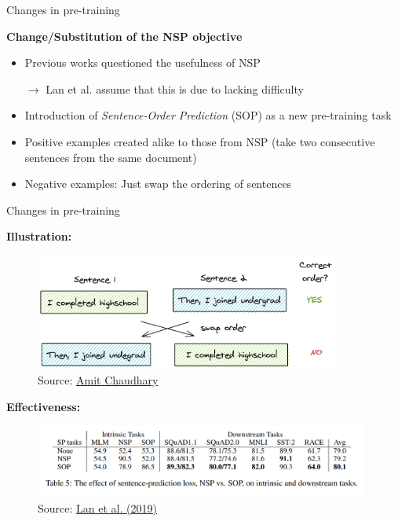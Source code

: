 
\begin{frame}{Changes in pre-training}

\vfill

	\textbf{Change/Substitution of the NSP objective}
		
	\begin{itemize}
			\item Previous works questioned the usefulness of NSP
			\item[$\to$] Lan et al. assume that this is due to lacking difficulty
			\item Introduction of \textit{Sentence-Order Prediction} (SOP) as a new pre-training task
			\item Positive examples created alike to those from NSP (take two consecutive sentences from the same document)
			\item Negative examples: Just swap the ordering of sentences
	\end{itemize}

\vfill

\end{frame}


\begin{frame}{Changes in pre-training}

\vfill

	\textbf{Illustration:}
		
	\begin{figure}
		\centering
		\includegraphics[width = 10cm]{figure/albert-sop.png}\\ 
		\footnotesize{Source:} \href{https://amitness.com/2020/02/albert-visual-summary/}{\footnotesize Amit Chaudhary}
	\end{figure}

	\textbf{Effectiveness:}
		
	\begin{figure}
		\centering
		\includegraphics[width = 11cm]{figure/albert-sop-ablation.png}\\ 
		\footnotesize{Source:} \href{https://arxiv.org/pdf/1907.11942.pdf}{\footnotesize Lan et al. (2019)}
	\end{figure}

\vfill

\end{frame}

